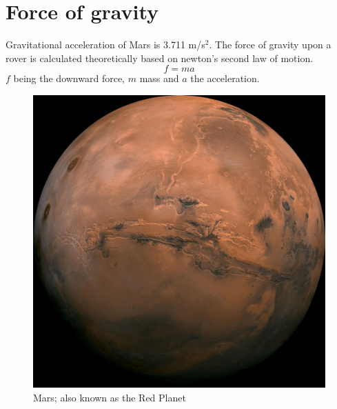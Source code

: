 \newpage
\section{Force of gravity}
Gravitational acceleration of Mars is 3.711 m/s$^2$. The force of gravity upon a rover is calculated theoretically based on newton's second law of motion.
$$f=ma$$
$f$ being the downward force, $m$ mass and $a$ the acceleration.

\begin{figure}[h]
    \centering
    \includegraphics[width=.5\linewidth]{figures/marsImage01.jpg}
    \caption{Mars; also known as the Red Planet\cite{MarsPicture01}}
    \label{fig:marsPicture01}
\end{figure}




